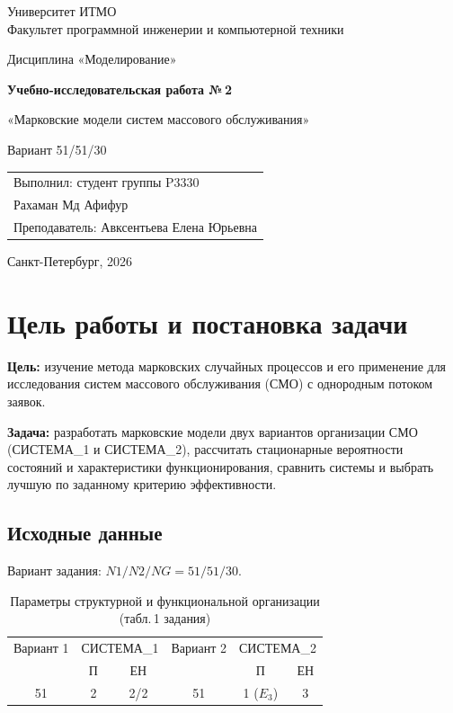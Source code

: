 \documentclass[12pt,a4paper]{article}
\begin{document}
\begin{titlepage}
\centering
{\large Университет ИТМО\\Факультет программной инженерии и компьютерной техники\par}
\vspace{5cm}
{\Large Дисциплина «Моделирование»\par}
\vspace{1cm}
{\LARGE\bfseries Учебно-исследовательская работа №\,2\par}
\vspace{0.4cm}
{\Large «Марковские модели систем массового обслуживания»\par}
\vspace{0.6cm}
{\large Вариант 51/51/30\par}
\vfill
\begin{flushright}
\begin{tabular}{l}
Выполнил: студент группы P3330\\
Рахаман Мд Афифур\\[4mm]
Преподаватель: Авксентьева Елена Юрьевна\\
\end{tabular}
\end{flushright}
\vspace{2cm}
Санкт-Петербург, 2026
\end{titlepage}

\tableofcontents
\newpage

\section{Цель работы и постановка задачи}
\textbf{Цель:} изучение метода марковских случайных процессов и его применение для исследования
систем массового обслуживания (СМО) с однородным потоком заявок.

\textbf{Задача:} разработать марковские модели двух вариантов организации СМО (СИСТЕМА\_1 и СИСТЕМА\_2),
рассчитать стационарные вероятности состояний и характеристики функционирования,
сравнить системы и выбрать лучшую по заданному критерию эффективности.

\subsection{Исходные данные}
Вариант задания: $N1/N2/NG = 51/51/30$.

\begin{table}[H]
\centering
\caption{Параметры структурной и функциональной организации (табл.\,1 задания)}
\begin{tabular}{cccccc}
\toprule
Вариант 1 & \multicolumn{2}{c}{СИСТЕМА\_1} & Вариант 2 & \multicolumn{2}{c}{СИСТЕМА\_2} \\
 & П & ЕН & & П & ЕН \\
\midrule
51 & 2 & 2/2 & 51 & 1 ($E_3$) & 3 \\
\bottomrule
\end{tabular}
\end{table}
\end{document}
